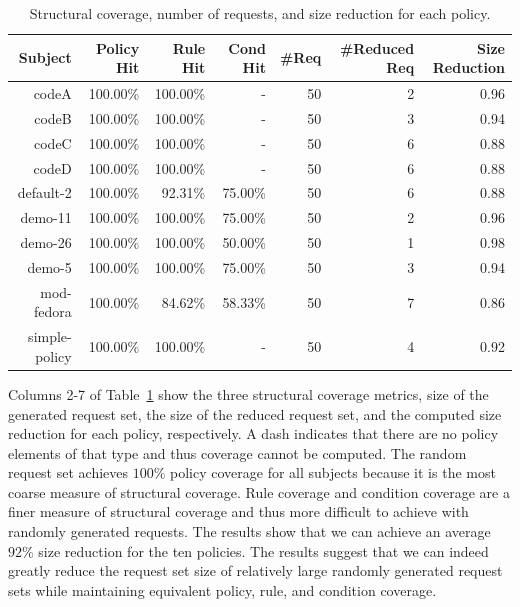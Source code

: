 \begin{table}[t]
    \centering
    \caption{Structural coverage, number of requests, and size reduction for each policy.}
    \label{table:coverage}
    \begin{small}
\begin{tabular}{|r|r|r|r|r|r|r|}
\hline
   Subject &     Policy Hit &    Rule Hit &    Cond Hit &     \#Req &  \#Reduced Req &    Size Reduction \\
\hline \hline
     codeA &   100.00\% &   100.00\% &     - &         50 &          2 &       0.96 \\\hline

     codeB &   100.00\% &   100.00\% &     - &         50 &          3 &       0.94 \\\hline

     codeC &   100.00\% &   100.00\% &     - &         50 &          6 &       0.88 \\\hline

     codeD &   100.00\% &   100.00\% &     - &         50 &          6 &       0.88 \\\hline

 default-2 &   100.00\% &    92.31\% &    75.00\% &         50 &          6 &       0.88 \\\hline

   demo-11 &   100.00\% &   100.00\% &    75.00\% &         50 &          2 &       0.96 \\\hline

   demo-26 &   100.00\% &   100.00\% &    50.00\% &         50 &          1 &       0.98 \\\hline

    demo-5 &   100.00\% &   100.00\% &    75.00\% &         50 &          3 &       0.94 \\\hline

mod-fedora &   100.00\% &    84.62\% &    58.33\% &         50 &
7 &       0.86 \\\hline

simple-policy &   100.00\% &   100.00\% &     - &         50 &          4 &       0.92 \\
\hline
\end{tabular}
\end{small}
\end{table}

Columns 2-7 of Table~\ref{table:coverage} show the three structural
coverage metrics, size of the generated request set, the size of the
reduced request set, and the computed size reduction for each
policy, respectively. A dash indicates that there are no policy
elements of that type and thus coverage cannot be computed. The
random request set achieves $100\%$ policy coverage for all subjects
because it is the most coarse measure of structural coverage. Rule
coverage and condition coverage are a finer measure of structural
coverage and thus more difficult to achieve with randomly generated
requests. The results show that we can achieve an average $92\%$
size reduction for the ten policies. The results suggest that we can
indeed greatly reduce the request set size of relatively large
randomly generated request sets while maintaining equivalent policy,
rule, and condition coverage.

